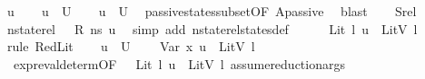 \begin{isabellebody}
\ u{\isacharprime}{\kern0pt}\isanewline
\ \ \isamarkupfalse%
\ {\isachardoublequoteopen}u{\isacharprime}{\kern0pt}\ {\isasymin}\ {\isacharquery}{\kern0pt}U{\isacharprime}{\kern0pt}{\isachardoublequoteclose}\isanewline
\ \ \isamarkupfalse%
\ {\isachardoublequoteopen}u{\isacharprime}{\kern0pt}\ {\isasymin}\ U{\isachardoublequoteclose}\ \isamarkupfalse%
\ passive{\isacharunderscore}{\kern0pt}states{\isacharunderscore}{\kern0pt}subset{\isacharbrackleft}{\kern0pt}OF\ Apassive{\isacharbrackright}{\kern0pt}\ \isamarkupfalse%
\ blast\isanewline
\ \ \isamarkupfalse%
\ Srel\ \isamarkupfalse%
\ {\isachardoublequoteopen}nstate{\isacharunderscore}{\kern0pt}rel\ {\isasymLambda}\ {\isasymLambda}{\isacharprime}{\kern0pt}\ R\ ns\ u{\isacharprime}{\kern0pt}{\isachardoublequoteclose}\ \isamarkupfalse%
\ {\isacharparenleft}{\kern0pt}simp\ add{\isacharcolon}{\kern0pt}\ nstate{\isacharunderscore}{\kern0pt}rel{\isacharunderscore}{\kern0pt}states{\isacharunderscore}{\kern0pt}def{\isacharparenright}{\kern0pt}\isanewline
\ \ \isamarkupfalse%
\ {\isachardoublequoteopen}{\isasymLambda}{\isacharprime}{\kern0pt}{\isacharcomma}{\kern0pt}{\isasymGamma}{\isacharcomma}{\kern0pt}{\isasymOmega}\ {\isasymturnstile}\ {\isasymlangle}Lit\ l{\isacharcomma}{\kern0pt}\ u{\isacharprime}{\kern0pt}{\isasymrangle}\ {\isasymDown}\ {\isacharparenleft}{\kern0pt}LitV\ l{\isacharparenright}{\kern0pt}{\isachardoublequoteclose}\ \isamarkupfalse%
\ {\isacharparenleft}{\kern0pt}rule\ RedLit{\isacharparenright}{\kern0pt}\isanewline
\ \ \isamarkupfalse%
\ {\isacartoucheopen}u{\isacharprime}{\kern0pt}\ {\isasymin}\ {\isacharquery}{\kern0pt}U{\isacharprime}{\kern0pt}{\isacartoucheclose}\ \isamarkupfalse%
\ {\isachardoublequoteopen}{\isasymLambda}{\isacharprime}{\kern0pt}{\isacharcomma}{\kern0pt}{\isasymGamma}{\isacharcomma}{\kern0pt}{\isasymOmega}\ {\isasymturnstile}\ {\isasymlangle}Var\ x{}{\isacharcomma}{\kern0pt}\ u{\isacharprime}{\kern0pt}{\isasymrangle}\ {\isasymDown}\ {\isacharparenleft}{\kern0pt}LitV\ l{\isacharparenright}{\kern0pt}{\isachardoublequoteclose}\ \isanewline
\ \ \ \isamarkupfalse%
\ \ expr{\isacharunderscore}{\kern0pt}eval{\isacharunderscore}{\kern0pt}determ{\isacharparenleft}{\kern0pt}{}{\isacharparenright}{\kern0pt}{\isacharbrackleft}{\kern0pt}OF\ {\isacartoucheopen}{\isasymLambda}{\isacharprime}{\kern0pt}{\isacharcomma}{\kern0pt}{\isasymGamma}{\isacharcomma}{\kern0pt}{\isasymOmega}\ {\isasymturnstile}\ {\isasymlangle}Lit\ l{\isacharcomma}{\kern0pt}\ u{\isacharprime}{\kern0pt}{\isasymrangle}\ {\isasymDown}\ LitV\ l{\isacartoucheclose}{\isacharbrackright}{\kern0pt}\ assume{\isacharunderscore}{\kern0pt}reduction{\isacharunderscore}{\kern0pt}args\ \isamarkupfalse%

\end{isabellebody}
